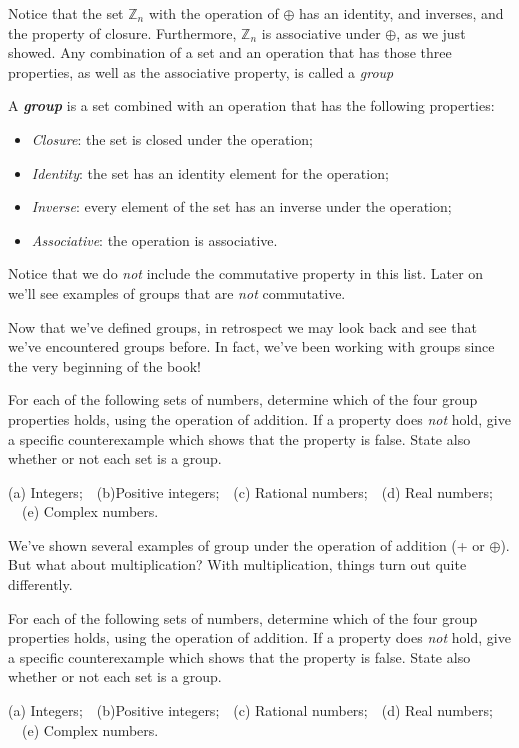 Notice that the set ${\mathbb Z}_n$ with the operation of $\oplus$ has an identity, and inverses, and the property of closure. Furthermore, ${\mathbb Z}_n$ is associative under $\oplus$, as we just showed.  Any combination of a set and an operation that has those three properties, as well as the associative property, is called a \emph{group}

\begin{defn} \label{definition:modular:group} A \textbf{\textit{group}} is a set combined with an operation that has the following properties:
\begin{itemize}
\item \emph{Closure}: the set is closed under the operation;
\item \emph{Identity}: the set has an identity element for the operation;
\item \emph{Inverse}: every element of the set has an inverse under the operation;
\item \emph{Associative}: the operation is associative.
\end{itemize}
\end{defn}

\noindent
Notice that we do  \emph{not} include the commutative property in this list. Later on we'll see examples of groups that are \emph{not} commutative. 

Now that we've defined groups, in retrospect we may look back and see that we've encountered groups before. In fact, we've been working with groups since the very beginning of the book! 

\begin{exercise}{}
For each of the following sets of numbers, determine which of the four group properties holds, using the operation of addition. If a property does \emph{not} hold, give a specific counterexample which shows that the property is false. State also whether or not each set is a group.

\noindent (a) Integers;~~(b)Positive integers;~~(c) Rational numbers;~~(d) Real numbers; ~~(e) Complex numbers.
\end{exercise}


We've shown several examples of group under the operation of addition (+ or $\oplus$). But what about multiplication? With multiplication, things turn out quite differently.


\begin{exercise}{}
For each of the following sets of numbers, determine which of the four group properties holds, using the operation of addition. If a property does \emph{not} hold, give a specific counterexample which shows that the property is false. State also whether or not each set is a group.

\noindent (a) Integers;~~(b)Positive integers;~~(c) Rational numbers;~~(d) Real numbers; ~~(e) Complex numbers.
\end{exercise}

